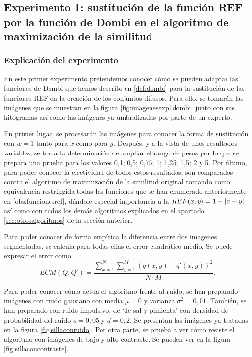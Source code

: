 \subsection{Experimento 1: sustitución de la función REF por la función de Dombi en el algoritmo de maximización de la similitud}
\subsubsection{Explicación del experimento}
En este primer experimento pretendemos conocer cómo se pueden adaptar las funciones de Dombi que hemos descrito en \ref{def:dombi} para la sustitución de las funciones REF en la creación de los conjuntos difusos. Para ello, se tomarán las imágenes que se muestran en la figura \ref{fig:imagenesexp1dombi} junto con sus hitogramas así como las imágenes ya umbralizadas por parte de un experto. 

En primer lugar, se procesarán las imágenes para conocer la forma de sustitución con $w=1$ tanto para $x$ como para $y$. Después, y a la vista de unos resultados variables, se toma la determinación de ampliar el rango de pesos por lo que se prepara una prueba para los valores 0,1; 0,5; 0,75; 1; 1,25; 1,5; 2 y 5. Por último, para poder conocer la efectividad de todos estos resultados, son comparados contra el algoritmo de maximización de la similitud original tomando como equivalencia restringida todas las funciones que se han enumerado anteriormente en \ref{obs:funcionesref}, dándole especial importancia a la $REF(x,y)=1-\left\vert x-y\right\vert$ así como con todos los demás algoritmos explicados en el apartado \ref{sec:otrosalgoritmos} de la sección anterior. 

Para poder conocer de forma empírica la diferencia entre dos imagenes segmentadas, se calcula para todas ellas el error cuadrático medio. Se puede expresar el error como
$$ECM(Q, Q') = \frac{\sum_{x=1}^N\sum_{y=1}^M \left(q(x,y)-q'(x,y)\right)^2}{N\cdot M}.$$

Para poder conocer cómo actua el algoritmo frente al ruido, se han preparado imágenes con ruido gausiano con media $\mu=0$ y varianza $\sigma^2 = 0,01$. También, se han preparado con ruido impulsivo, de `de sal y pimienta' con densidad de probabilidad del ruido $d=0,05$ y $d=0,2$. Se presentan las imágenes ya tratadas en la figura \ref{fig:sillaconruido}. Por otra parte, se prueba a ver cómo resiste el algoritmo con imágenes de bajo y alto contraste. Se pueden ver en la figura \ref{fig:sillaconcontraste}.

